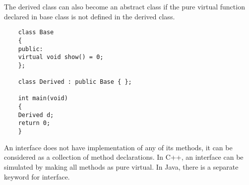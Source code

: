 \documentclass[11pt,fleqn]{book} %
\begin{document}
The derived class can also become an abstract class if the pure virtual function declared in base class is not defined in the derived class.
\begin{example}
	\begin{lstlisting}
	class Base
	{
	public:
	virtual void show() = 0;
	};
	
	class Derived : public Base { };
	
	int main(void)
	{
	Derived d;
	return 0;
	}
	\end{lstlisting}
\end{example}
\begin{corollary}
	An interface does not have implementation of any of its methods, it can be considered as a collection of method declarations. In C++, an interface can be simulated by making all methods as pure virtual. In Java, there is a separate keyword for interface.
\end{corollary}

\newpage
\end{document}
